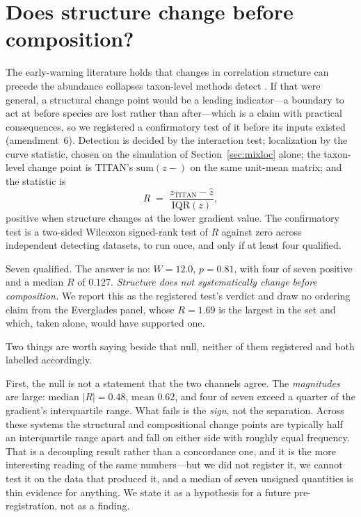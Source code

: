 \documentclass[review,12pt,authoryear]{elsarticle}
\theoremstyle{remark}
\begin{document}
\section{Does structure change before composition?}
\label{sec:ordering}

The early-warning literature holds that changes in correlation structure can
precede the abundance collapses taxon-level methods detect
\citep{scheffer2009ews}. If that were general, a structural change point
would be a leading indicator---a boundary to act at before species are lost
rather than after---which is a claim with practical consequences, so we
registered a confirmatory test of it before its inputs existed
(amendment~6). Detection is decided by the interaction test; localization by
the curve statistic, chosen on the simulation of Section~\ref{sec:mixloc}
alone; the taxon-level change point is TITAN's $\mathrm{sum}(z-)$ on the
same unit-mean matrix; and the statistic is
\[
  R \;=\; \frac{z_{\mathrm{TITAN}} - \hat z}{\mathrm{IQR}(z)},
\]
positive when structure changes at the lower gradient value. The
confirmatory test is a two-sided Wilcoxon signed-rank test of $R$ against
zero across independent detecting datasets, to run once, and only if at
least four qualified.

Seven qualified. The answer is no: $W = 12.0$, $p = 0.81$, with four of
seven positive and a median $R$ of $0.127$. \emph{Structure does not
systematically change before composition.} We report this as the registered
test's verdict and draw no ordering claim from the Everglades panel, whose
$R = 1.69$ is the largest in the set and which, taken alone, would have
supported one.

Two things are worth saying beside that null, neither of them registered and
both labelled accordingly.

First, the null is not a statement that the two channels agree. The
\emph{magnitudes} are large: median $|R| = 0.48$, mean $0.62$, and four of
seven exceed a quarter of the gradient's interquartile range. What fails is
the \emph{sign}, not the separation. Across these systems the structural and
compositional change points are typically half an interquartile range apart
and fall on either side with roughly equal frequency. That is a decoupling
result rather than a concordance one, and it is the more interesting reading
of the same numbers---but we did not register it, we cannot test it on the
data that produced it, and a median of seven unsigned quantities is thin
evidence for anything. We state it as a hypothesis for a future
pre-registration, not as a finding.
\end{document}
